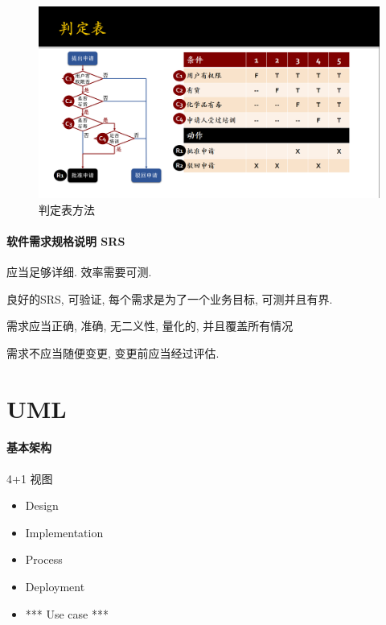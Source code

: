 \documentclass{ctexart}
\begin{document}
    \begin{figure}[ht!]
        \centering
        \includegraphics[width=\textwidth, height=\textheight, keepaspectratio]{pred-tbl.png}
        \caption{判定表方法}
    \end{figure}
\paragraph{软件需求规格说明 SRS}
    应当足够详细. 效率需要可测.\par
    良好的SRS, 可验证, 每个需求是为了一个业务目标, 可测并且有界.\par
    [条件] [主体] [动作] [客体] [对某个参数的约束] [约束的值]\par
    需求应当正确, 准确, 无二义性, 量化的, 并且覆盖所有情况\par
    需求不应当随便变更, 变更前应当经过评估.\par

\section{UML}
\paragraph{基本架构} 4+1 视图 \begin{itemize}
        \item Design
        \item Implementation
        \item Process
        \item Deployment
        \item *** Use case ***
    \end{itemize}
\end{document}
